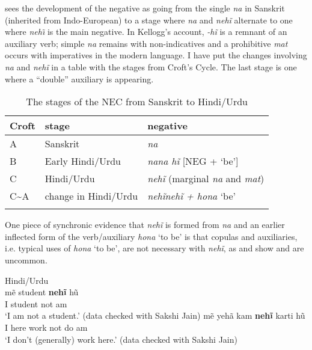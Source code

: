 ﻿\documentclass[output=paper]{langsci/langscibook}
\begin{document}
\citet{Kellogg1938} sees the development of the negative as going from the
single \textit{na} in Sanskrit (inherited from Indo-European) to a stage
where \textit{na} and \textit{nehĩ} alternate to one where
\textit{neh\~\i} is the main negative. In Kellogg's account,
\textit{-hĩ} is a remnant of an auxiliary verb; simple \textit{na}
remains with non-indicatives and a prohibitive \textit{mat} occurs with
imperatives in the modern language. I have put the changes involving
\textit{na} and \textit{nehĩ} in a table with the stages from Croft's
Cycle. The last stage is one where a ``double'' auxiliary is
appearing.
%
\begin{table}
\caption{The stages of the NEC from Sanskrit to  Hindi\slash Urdu}
\label{tab:oth-Sanskrit}
\begin{tabularx}{\textwidth}{l l l}
\lsptoprule
\textbf{Croft}    &\textbf{stage}      &\textbf{negative}\\
\midrule
A               &Sanskrit           &\textit{na}\\
B               &Early Hindi\slash Urdu  &\textit{na}\hspace{1cm}\textit{na
hĩ} [NEG + `be']\\ 
C               &Hindi\slash Urdu         &\textit{nehĩ}  (marginal \textit{na}
and \textit{mat})\\
C{\textasciitilde}A    &change in Hindi\slash Urdu
&\textit{nehĩ}\hspace{1cm}\textit{nehĩ + hona} `be'\\
\lspbottomrule
\end{tabularx}
\end{table}
%
One piece of synchronic evidence that \textit{nehĩ} is formed from
\textit{na} and an earlier inflected  form of the verb\slash auxiliary
\textit{hona} `to be' is that copulas and auxiliaries, i.e.
typical uses of \textit{hona} `to be', are not necessary
with \textit{nehĩ}, as  and
 show and are uncommon.
%
\begin{exe}
    \ex Hindi\slash Urdu \label{ex:other-hindi-student}\\
    \gll mẽ  student    \textbf{nehĩ}   {\op}hũ{\cp}  \\
  I  student    not  am \\ \jambox{}
    \glt `I am not a student.' (data checked with Sakshi Jain)
    \ex\label{ex:other-hindi-work}
    \gll mẽ  yehã  kam  \textbf{nehĩ}  karti  {\op}hũ{\cp} \\
  I  here  work  not  do  am \\
    \glt `I don't (generally) work here.' (data checked with Sakshi Jain)
    \end{exe}
\end{document}
